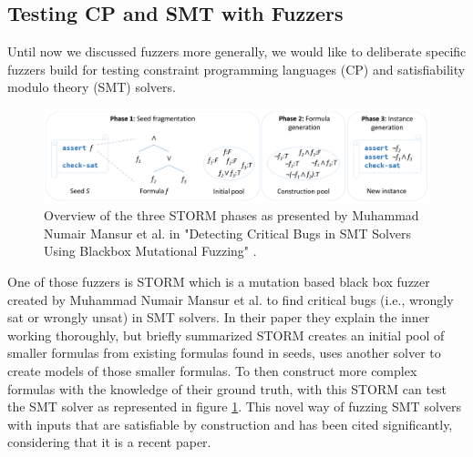 \subsection{Testing CP and SMT with Fuzzers}
\label{fuzzing:testingWithFuzzers}
Until now we discussed fuzzers more generally, we would like to deliberate specific fuzzers build for testing constraint programming languages (CP) and satisfiability modulo theory (SMT) solvers.
\begin{figure}
	\centering
	\includegraphics[width=1.0\textwidth]{images/STORM}
	\caption{Overview of the three STORM phases as presented by Muhammad Numair Mansur et al. in "Detecting Critical Bugs in SMT Solvers Using Blackbox Mutational Fuzzing" \cite{1mansur2020detecting}.}
	\label{fig:STORM}
\end{figure}
One of those fuzzers is STORM which is a mutation based black box fuzzer created by Muhammad Numair Mansur et al. \cite{1mansur2020detecting} to find critical bugs (i.e., wrongly sat or wrongly unsat) in SMT solvers. In their paper \cite{1mansur2020detecting} they explain the inner working thoroughly, but briefly summarized STORM creates an initial pool of smaller formulas from existing formulas found in seeds, uses another solver to create models of those smaller formulas. To then construct more complex formulas with the knowledge of their ground truth, with this STORM can test the SMT solver as represented in figure \ref{fig:STORM}. This novel way of fuzzing SMT solvers with inputs that are satisfiable by construction and has been cited significantly, considering that it is a recent paper.

